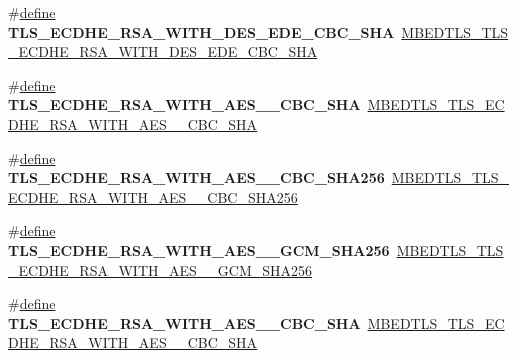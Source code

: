 \begin{DoxyCompactItemize}
\item 
\mbox{\label{compat-1_83_8h_a7f0f5245bc820bbc208a4b30e3ea3302}} 
\#\hyperlink{structdefine}{define} {\bfseries T\+L\+S\+\_\+\+E\+C\+D\+H\+E\+\_\+\+R\+S\+A\+\_\+\+W\+I\+T\+H\+\_\+D\+E\+S\+\_\+\+E\+D\+E\+\_\+\+C\+B\+C\+\_\+\+S\+HA}~\hyperlink{ssl__ciphersuites_8h_a2ce6bb7b4689abcfc4d1e60e4da6e8af}{M\+B\+E\+D\+T\+L\+S\+\_\+\+T\+L\+S\+\_\+\+E\+C\+D\+H\+E\+\_\+\+R\+S\+A\+\_\+\+W\+I\+T\+H\+\_\+D\+E\+S\+\_\+\+E\+D\+E\+\_\+\+C\+B\+C\+\_\+\+S\+HA}
\item 
\mbox{\label{compat-1_83_8h_a61caecb35301de4dba9ea87288f58b91}} 
\#\hyperlink{structdefine}{define} {\bfseries T\+L\+S\+\_\+\+E\+C\+D\+H\+E\+\_\+\+R\+S\+A\+\_\+\+W\+I\+T\+H\+\_\+\+A\+E\+S\+\_\+\_\+\+C\+B\+C\+\_\+\+S\+HA}~\hyperlink{ssl__ciphersuites_8h_a21b4bdb8de8f579c591bc5c45f1faf05}{M\+B\+E\+D\+T\+L\+S\+\_\+\+T\+L\+S\+\_\+\+E\+C\+D\+H\+E\+\_\+\+R\+S\+A\+\_\+\+W\+I\+T\+H\+\_\+\+A\+E\+S\+\_\+\_\+\+C\+B\+C\+\_\+\+S\+HA}
\item 
\mbox{\label{compat-1_83_8h_acdd0b724733e8b6e408cc7ce53b6d0db}} 
\#\hyperlink{structdefine}{define} {\bfseries T\+L\+S\+\_\+\+E\+C\+D\+H\+E\+\_\+\+R\+S\+A\+\_\+\+W\+I\+T\+H\+\_\+\+A\+E\+S\+\_\+\_\+\+C\+B\+C\+\_\+\+S\+H\+A256}~\hyperlink{ssl__ciphersuites_8h_a70908a91d8e474b415acfaf437e451a1}{M\+B\+E\+D\+T\+L\+S\+\_\+\+T\+L\+S\+\_\+\+E\+C\+D\+H\+E\+\_\+\+R\+S\+A\+\_\+\+W\+I\+T\+H\+\_\+\+A\+E\+S\+\_\+\_\+\+C\+B\+C\+\_\+\+S\+H\+A256}
\item 
\mbox{\label{compat-1_83_8h_a3654359382307a986b1834a812c69f64}} 
\#\hyperlink{structdefine}{define} {\bfseries T\+L\+S\+\_\+\+E\+C\+D\+H\+E\+\_\+\+R\+S\+A\+\_\+\+W\+I\+T\+H\+\_\+\+A\+E\+S\+\_\+\_\+\+G\+C\+M\+\_\+\+S\+H\+A256}~\hyperlink{ssl__ciphersuites_8h_a3d0bf2e4e26ea78e93012aa71225bb45}{M\+B\+E\+D\+T\+L\+S\+\_\+\+T\+L\+S\+\_\+\+E\+C\+D\+H\+E\+\_\+\+R\+S\+A\+\_\+\+W\+I\+T\+H\+\_\+\+A\+E\+S\+\_\+\_\+\+G\+C\+M\+\_\+\+S\+H\+A256}
\item 
\mbox{\label{compat-1_83_8h_a9889f63e65374add6ecf1b0243c381f4}} 
\#\hyperlink{structdefine}{define} {\bfseries T\+L\+S\+\_\+\+E\+C\+D\+H\+E\+\_\+\+R\+S\+A\+\_\+\+W\+I\+T\+H\+\_\+\+A\+E\+S\+\_\+\_\+\+C\+B\+C\+\_\+\+S\+HA}~\hyperlink{ssl__ciphersuites_8h_ad345b02fd7b519c4980fcbb5a7cabc88}{M\+B\+E\+D\+T\+L\+S\+\_\+\+T\+L\+S\+\_\+\+E\+C\+D\+H\+E\+\_\+\+R\+S\+A\+\_\+\+W\+I\+T\+H\+\_\+\+A\+E\+S\+\_\+\_\+\+C\+B\+C\+\_\+\+S\+HA}

\end{DoxyCompactItemize}
